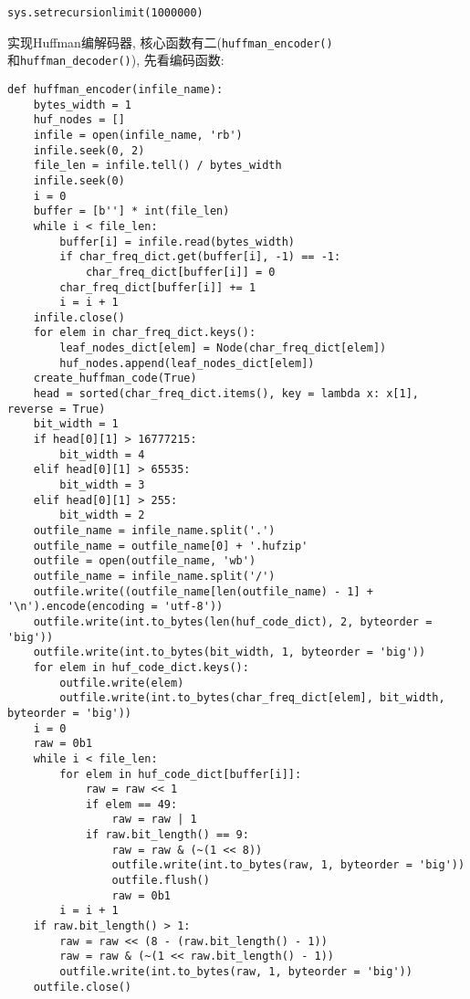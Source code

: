 \documentclass[a4paper]{ctexart}
\begin{document}
{\setmainfont{Courier New Bold}              
\begin{lstlisting}
sys.setrecursionlimit(1000000)
\end{lstlisting}}

实现Huffman编解码器, 核心函数有二(\texttt{huffman\_encoder()}\\和\texttt{huffman\_decoder()}), 先看编码函数:

{\setmainfont{Courier New Bold}              
\begin{lstlisting}
def huffman_encoder(infile_name):
    bytes_width = 1
    huf_nodes = []
    infile = open(infile_name, 'rb')
    infile.seek(0, 2)
    file_len = infile.tell() / bytes_width
    infile.seek(0)
    i = 0
    buffer = [b''] * int(file_len)
    while i < file_len:
        buffer[i] = infile.read(bytes_width)
        if char_freq_dict.get(buffer[i], -1) == -1:
            char_freq_dict[buffer[i]] = 0
        char_freq_dict[buffer[i]] += 1
        i = i + 1
    infile.close()
    for elem in char_freq_dict.keys():
        leaf_nodes_dict[elem] = Node(char_freq_dict[elem])
        huf_nodes.append(leaf_nodes_dict[elem])
    create_huffman_code(True)
    head = sorted(char_freq_dict.items(), key = lambda x: x[1], reverse = True)
    bit_width = 1
    if head[0][1] > 16777215:
        bit_width = 4
    elif head[0][1] > 65535:
        bit_width = 3
    elif head[0][1] > 255:
        bit_width = 2
    outfile_name = infile_name.split('.')
    outfile_name = outfile_name[0] + '.hufzip'
    outfile = open(outfile_name, 'wb')
    outfile_name = infile_name.split('/')
    outfile.write((outfile_name[len(outfile_name) - 1] + '\n').encode(encoding = 'utf-8'))
    outfile.write(int.to_bytes(len(huf_code_dict), 2, byteorder = 'big'))
    outfile.write(int.to_bytes(bit_width, 1, byteorder = 'big'))
    for elem in huf_code_dict.keys():
        outfile.write(elem)
        outfile.write(int.to_bytes(char_freq_dict[elem], bit_width, byteorder = 'big'))
    i = 0
    raw = 0b1
    while i < file_len:
        for elem in huf_code_dict[buffer[i]]:
            raw = raw << 1
            if elem == 49:
                raw = raw | 1
            if raw.bit_length() == 9:
                raw = raw & (~(1 << 8))
                outfile.write(int.to_bytes(raw, 1, byteorder = 'big'))
                outfile.flush()
                raw = 0b1
        i = i + 1
    if raw.bit_length() > 1:
        raw = raw << (8 - (raw.bit_length() - 1))
        raw = raw & (~(1 << raw.bit_length() - 1))
        outfile.write(int.to_bytes(raw, 1, byteorder = 'big'))
    outfile.close()
\end{lstlisting}}
\end{document}
